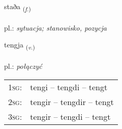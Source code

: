 \documentclass[frontgrid, backgrid]{flacards}\usepackage[]{graphicx}\usepackage[]{xcolor}
\begin{document}
\renewcommand{\blhead}{\vskip5pt {\small\bfseries\footnotesize Nafnorð | Noun }}
\renewcommand{\bcfoot}{\vskip5pt \hspace{2pt}{\small\bfseries\footnotesize 1K}}


{staða \small{\textsubscript{(\textit{f.})}} \\[1ex] %
\textphonetic{[staːða]} \\
pl.: \emph{sytuacja; stanowisko, pozycja} \\  [2ex]
\renewcommand*{\arraystretch}{0.8}
}

\renewcommand{\flhead}{\vskip5pt \fboxsep=0pt {\small\bfseries\footnotesize Sagnorð | Verb}}
\renewcommand{\fcfoot}{\vskip5pt \fboxsep=0pt \hspace{2pt}{\small\bfseries\footnotesize 1K}}

\renewcommand{\blhead}{\vskip5pt {\small\bfseries\footnotesize Sagnorð | Verb }}
\renewcommand{\bcfoot}{\vskip5pt \hspace{2pt}{\small\bfseries\footnotesize 1K}}


{tengja \small{\textsubscript{(\textit{v.})}} \\[1ex] %
\textphonetic{[tʰeiɲca]} \\
pl.: \emph{połączyć} \\  [2ex]
\renewcommand*{\arraystretch}{0.8}
\begin{tabular}{p{1cm}l}
\textsc{1sg}: & tengi -- tengdi -- tengt \\ 
\textsc{2sg}: & tengir -- tengdir -- tengt \\ 
\textsc{3sg}: & tengir -- tengdi -- tengt \\ 
\end{tabular}
}
\end{document}
